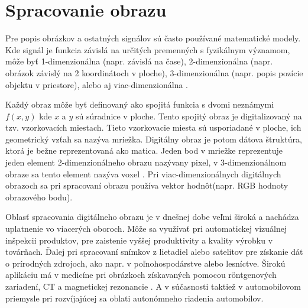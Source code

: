 
\section{Spracovanie obrazu}
\label{sec:imageprocessing}
Pre popis obrázkov a ostatných signálov sú často používané matematické modely.
Kde signál je funkcia závislá na určitých premenných s fyzikálnym významom, môže byť 1-dimenzionálna (napr. závislá na čase),
2-dimenzionálna (napr. obrázok závislý na 2 koordinátoch v ploche), 3-dimenzionálna (napr. popis pozície objektu v priestore), alebo aj viac-dimenzionálna \cite{book:ImageProcessing}.

Každý obraz môže byť definovaný ako spojitá funkcia s dvomi neznámymi $f(x,y)$ kde $x$ a $y$ sú súradnice v ploche.
Tento spojitý obraz je digitalizovaný na tzv. vzorkovacích miestach.
Tieto vzorkovacie miesta sú usporiadané v ploche, ich geometrický vzťah sa nazýva mriežka.
Digitálny obraz je potom dátova štruktúra, ktorá je bežne reprezentovaná ako matica.
Jeden bod v mriežke reprezentuje jeden element 2-dimenzionálneho obrazu nazývany pixel, v 3-dimenzionálnom obraze sa tento element nazýva voxel \cite{book:ImageProcessing}.
Pri viac-dimenzionálnych digitálnych obrazoch sa pri spracovaní obrazu používa vektor hodnôt(napr. RGB hodnoty obrazového bodu).

Oblasť spracovania digitálneho obrazu je v dnešnej dobe veľmi široká a nachádza uplatnenie vo viacerých oboroch.
Môže sa využívať pri automatickej vizuálnej inšpekcii produktov, pre zaistenie vyššej produktivity a kvality výrobku v továrňach.
Ďalej pri spracovaní snímkov z lietadiel alebo satelitov pre získanie dát o prírodných zdrojoch, ako napr. v poľnohospodárstve alebo lesníctve.
Širokú aplikáciu má v medicíne pri obrázkoch získavaných pomocou röntgenových zariadení, CT a magnetickej rezonancie \cite{book:ImageProcessingApplication}.
A v súčasnosti taktiež v automobilovom priemysle pri rozvíjajúcej sa oblati autonómneho riadenia automobilov.
